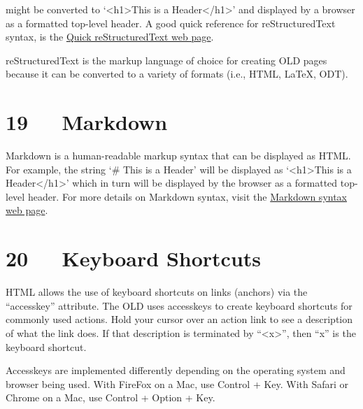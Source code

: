\documentclass[letterpaper,10pt,english]{sphinxmanual}
\begin{document}
might be converted to `\textless{}h1\textgreater{}This is a Header\textless{}/h1\textgreater{}' and displayed by a browser as a
formatted top-level header. A good quick reference for reStructuredText syntax,
is the \href{http://docutils.sourceforge.net/docs/user/rst/quickref.html\#external-hyperlink-targets}{Quick reStructuredText web page}.

reStructuredText is the markup language of choice for creating OLD pages because
it can be converted to a variety of formats (i.e., HTML, LaTeX, ODT).


\chapter{19   Markdown}
\label{documentation:markdown}
Markdown is a human-readable markup syntax that can be displayed as HTML.  For
example, the string `\# This is a Header' will be displayed as `\textless{}h1\textgreater{}This is a
Header\textless{}/h1\textgreater{}' which in turn will be displayed by the browser as a formatted
top-level header. For more details on Markdown syntax, visit the
\href{http://daringfireball.net/projects/markdown/syntax}{Markdown syntax web page}.


\chapter{20   Keyboard Shortcuts}
\label{documentation:keyboard-shortcuts}
HTML allows the use of keyboard shortcuts on links (anchors) via the ``accesskey''
attribute.  The OLD uses accesskeys to create keyboard shortcuts for commonly
used actions.  Hold your cursor over an action link to see a description of what
the link does.  If that description is terminated by ``\textless{}x\textgreater{}'', then ``x'' is the
keyboard shortcut.

Accesskeys are implemented differently depending on the operating system and
browser being used.  With FireFox on a Mac, use Control + Key.  With Safari or
Chrome on a Mac, use Control + Option + Key.
\end{document}
